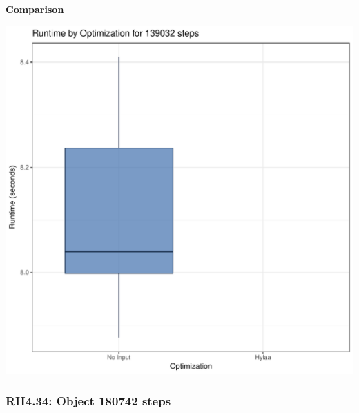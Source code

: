 \documentclass{article}\usepackage[]{graphicx}\usepackage[]{color}
\makeatletter
\def\maxwidth{ %
  \ifdim\Gin@nat@width>\linewidth
    \linewidth
  \else
    \Gin@nat@width
  \fi
}
\newenvironment{knitrout}{}{} %
\makeatother
\begin{document}
 \textbf{Comparison}
  
\begin{knitrout}
\color{fgcolor}
\includegraphics[width=\maxwidth]{figure/RH4_steps139032-1} 

\end{knitrout}


\subsubsection{RH4.34: Object 180742 steps}
\end{document}
